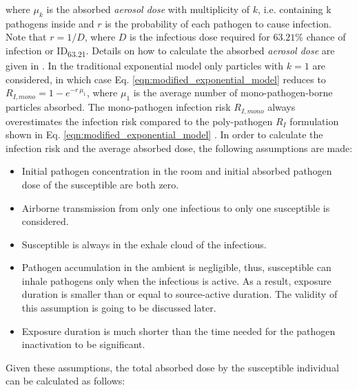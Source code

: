 \documentclass[preprint]{elsarticle}
\begin{document}
\noindent where $\mu_k$ is the absorbed \emph{aerosol dose} with multiplicity of $k$, i.e. containing k pathogens inside and $r$ is the probability of each pathogen to cause infection. Note that $r = 1/D$, where $D$ is the infectious dose required for $63.21$\% chance of infection or ID\textsubscript{63.21}. Details on how to calculate the absorbed \emph{aerosol dose} are given in \citep{Nordsiek2021}. In the traditional exponential model only particles with $k=1$ are considered, in which case Eq. \ref{eqn:modified_exponential_model} reduces to $R_{I, mono} = 1 - e^{-r\, \mu_1}$, where $\mu_1$ is the average number of mono-pathogen-borne particles absorbed. The mono-pathogen infection risk $R_{I, mono}$ always overestimates the infection risk compared to the poly-pathogen $R_I$ formulation shown in Eq. \ref{eqn:modified_exponential_model} \cite[see][for more details]{Nordsiek2021}. In order to calculate the infection risk and the average absorbed dose, the following assumptions are made:

\begin{itemize}[topsep=-1ex,itemsep=-1ex,partopsep=1ex,parsep=1ex]
    \item Initial pathogen concentration in the room and initial absorbed pathogen dose of the susceptible are both zero.
    \item Airborne transmission from only one infectious to only one susceptible is considered. 
    \item Susceptible is always in the exhale cloud of the infectious. 
    \item Pathogen accumulation in the ambient is negligible, thus, susceptible can inhale pathogens only when the infectious is active. As a result, exposure duration is smaller than or equal to source-active duration. The validity of this assumption is going to be discussed later. 
    \item Exposure duration is much shorter than the time needed for the pathogen inactivation to be significant. 
\end{itemize}

Given these assumptions, the total absorbed dose by the susceptible individual can be calculated as follows:
\end{document}
